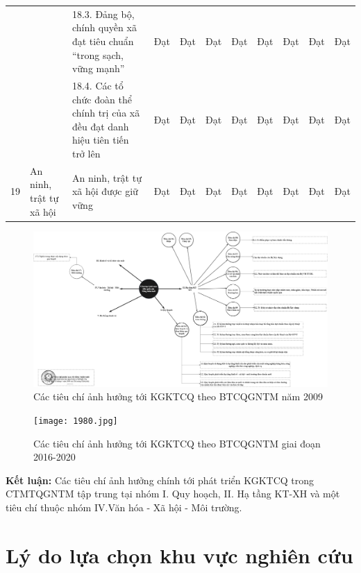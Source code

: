 \documentclass[../thesis.tex]{subfiles}
\begin{document}
\begin{landscape}
\begin{longtable}{|p{2cm}|p{2cm}|p{4cm}|p{2cm}|p{1cm}|p{1cm}|p{1cm}|p{1cm}|p{1cm}|p{1cm}|p{1cm}|}
 &
   &
  18.3. Đảng bộ, chính quyền xã   đạt tiêu chuẩn “trong sạch, vững mạnh” &
  Đạt &
  Đạt &
  Đạt &
  Đạt &
  Đạt &
  Đạt &
  Đạt &
  Đạt \\ \cline{3-11} 
 &
   &
  18.4. Các tổ chức đoàn thể   chính trị của xã đều đạt danh hiệu tiên tiến trở lên &
  Đạt &
  Đạt &
  Đạt &
  Đạt &
  Đạt &
  Đạt &
  Đạt &
  Đạt \\ \hline
19 &
  An   ninh, trật tự xã hội &
  An ninh, trật tự xã hội được   giữ vững &
  Đạt &
  Đạt &
  Đạt &
  Đạt &
  Đạt &
  Đạt &
  Đạt &
  Đạt \\ \hline
\end{longtable}
\end{landscape}
\begin{landscape}
\begin{figure}[ht!]
\includegraphics[width=24cm]{Graphic/491_QĐ-TTg.jpg}
\caption{Các tiêu chí ảnh hưởng tới KGKTCQ theo BTCQGNTM năm 2009}
\end{figure}
\clearpage

\begin{figure}[ht!]
\texttt{[image: 1980.jpg]}
\caption{Các tiêu chí ảnh hưởng tới KGKTCQ theo BTCQGNTM giai đoạn 2016-2020}
\end{figure}

\end{landscape}
\textbf{Kết luận:} Các tiêu chí ảnh hưởng chính tới phát triển KGKTCQ trong CTMTQGNTM tập trung  tại nhóm I. Quy hoạch, II. Hạ tầng KT-XH và một tiêu chí thuộc nhóm IV.Văn hóa - Xã hội - Môi trường.

\section{Lý do lựa chọn khu vực nghiên cứu}
\end{document}
